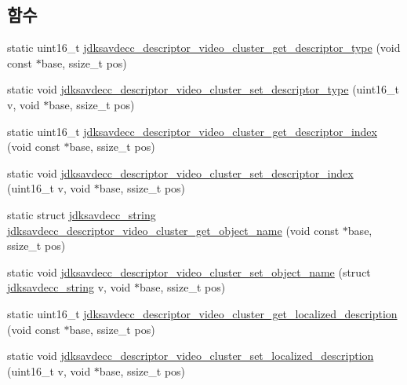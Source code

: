 \subsection*{함수}
\begin{DoxyCompactItemize}
\item 
static uint16\+\_\+t \hyperlink{group__descriptor__video__cluster_ga2eac6efa7af578446c3e39083b4f4db9}{jdksavdecc\+\_\+descriptor\+\_\+video\+\_\+cluster\+\_\+get\+\_\+descriptor\+\_\+type} (void const $\ast$base, ssize\+\_\+t pos)
\item 
static void \hyperlink{group__descriptor__video__cluster_ga937a1bf521614cc618340be195c4c1b9}{jdksavdecc\+\_\+descriptor\+\_\+video\+\_\+cluster\+\_\+set\+\_\+descriptor\+\_\+type} (uint16\+\_\+t v, void $\ast$base, ssize\+\_\+t pos)
\item 
static uint16\+\_\+t \hyperlink{group__descriptor__video__cluster_ga24c6f14f0461ccecfe3b391545603bd3}{jdksavdecc\+\_\+descriptor\+\_\+video\+\_\+cluster\+\_\+get\+\_\+descriptor\+\_\+index} (void const $\ast$base, ssize\+\_\+t pos)
\item 
static void \hyperlink{group__descriptor__video__cluster_gadc22d84cebba0d2ce4e296e9e872d02e}{jdksavdecc\+\_\+descriptor\+\_\+video\+\_\+cluster\+\_\+set\+\_\+descriptor\+\_\+index} (uint16\+\_\+t v, void $\ast$base, ssize\+\_\+t pos)
\item 
static struct \hyperlink{structjdksavdecc__string}{jdksavdecc\+\_\+string} \hyperlink{group__descriptor__video__cluster_ga1e1aee2e93f52abba56bc1ade7759d01}{jdksavdecc\+\_\+descriptor\+\_\+video\+\_\+cluster\+\_\+get\+\_\+object\+\_\+name} (void const $\ast$base, ssize\+\_\+t pos)
\item 
static void \hyperlink{group__descriptor__video__cluster_gae35f2549412a84852b99c1adf5ad9353}{jdksavdecc\+\_\+descriptor\+\_\+video\+\_\+cluster\+\_\+set\+\_\+object\+\_\+name} (struct \hyperlink{structjdksavdecc__string}{jdksavdecc\+\_\+string} v, void $\ast$base, ssize\+\_\+t pos)
\item 
static uint16\+\_\+t \hyperlink{group__descriptor__video__cluster_ga084e23b44e990a36da2ddac6337458de}{jdksavdecc\+\_\+descriptor\+\_\+video\+\_\+cluster\+\_\+get\+\_\+localized\+\_\+description} (void const $\ast$base, ssize\+\_\+t pos)
\item 
static void \hyperlink{group__descriptor__video__cluster_gae27b06526ad86b745c3643dbcd40db4b}{jdksavdecc\+\_\+descriptor\+\_\+video\+\_\+cluster\+\_\+set\+\_\+localized\+\_\+description} (uint16\+\_\+t v, void $\ast$base, ssize\+\_\+t pos)
\item 

\end{DoxyCompactItemize}
